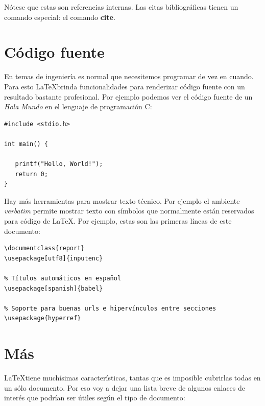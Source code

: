 \documentclass{report}
\begin{document}
Nótese que estas son referencias internas. Las citas bibliográficas tienen un comando especial: el comando \textbf{cite}.

\section{Código fuente}
En temas de ingeniería es normal que necesitemos programar de vez en cuando. Para esto \LaTeX brinda funcionalidades para renderizar código fuente con un resultado bastante profesional.
Por ejemplo podemos ver el código fuente de un \textit{Hola Mundo} en el lenguaje de programación C:

\begin{lstlisting}
#include <stdio.h>

int main() {
   
   printf("Hello, World!");
   return 0;
}
\end{lstlisting}

Hay más herramientas para mostrar texto técnico. Por ejemplo el ambiente \textit{verbatim} permite mostrar texto con símbolos que normalmente están reservados para código de \LaTeX. Por ejemplo, estas son las primeras líneas de este documento:

\begin{verbatim}
\documentclass{report}
\usepackage[utf8]{inputenc}

% Títulos automáticos en español
\usepackage[spanish]{babel}

% Soporte para buenas urls e hipervínculos entre secciones
\usepackage{hyperref}
\end{verbatim}

\section{Más}
\LaTeX tiene muchísimas características, tantas que es imposible cubrirlas todas en un sólo documento. Por eso voy a dejar una lista breve de algunos enlaces de interés que podrían ser útiles según el tipo de documento:
\end{document}
